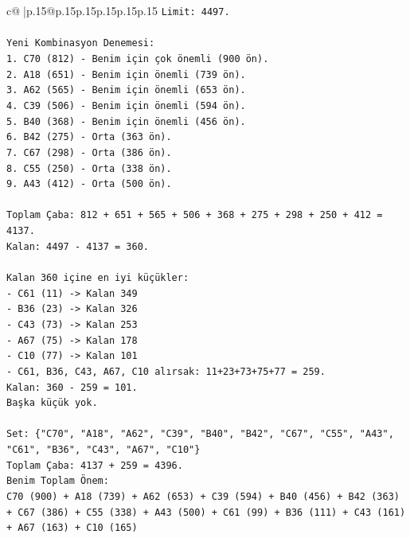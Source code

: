 \documentclass{article}
\begin{document}
{\begin{supertabular}{c@{$\;$}|p{.15\linewidth}@{}p{.15\linewidth}p{.15\linewidth}p{.15\linewidth}p{.15\linewidth}p{.15\linewidth}}
{{{\texttt{Limit: 4497.} \\
\\ 
\texttt{Yeni Kombinasyon Denemesi:} \\
\texttt{1. C70 (812) {-} Benim için çok önemli (900 ön).} \\
\texttt{2. A18 (651) {-} Benim için önemli (739 ön).} \\
\texttt{3. A62 (565) {-} Benim için önemli (653 ön).} \\
\texttt{4. C39 (506) {-} Benim için önemli (594 ön).} \\
\texttt{5. B40 (368) {-} Benim için önemli (456 ön).} \\
\texttt{6. B42 (275) {-} Orta (363 ön).} \\
\texttt{7. C67 (298) {-} Orta (386 ön).} \\
\texttt{8. C55 (250) {-} Orta (338 ön).} \\
\texttt{9. A43 (412) {-} Orta (500 ön).} \\
\\ 
\texttt{Toplam Çaba: 812 + 651 + 565 + 506 + 368 + 275 + 298 + 250 + 412 = 4137.} \\
\texttt{Kalan: 4497 {-} 4137 = 360.} \\
\\ 
\texttt{Kalan 360 içine en iyi küçükler:} \\
\texttt{{-} C61 (11) {-}> Kalan 349} \\
\texttt{{-} B36 (23) {-}> Kalan 326} \\
\texttt{{-} C43 (73) {-}> Kalan 253} \\
\texttt{{-} A67 (75) {-}> Kalan 178} \\
\texttt{{-} C10 (77) {-}> Kalan 101} \\
\texttt{{-} C61, B36, C43, A67, C10 alırsak: 11+23+73+75+77 = 259.} \\
\texttt{Kalan: 360 {-} 259 = 101.} \\
\texttt{Başka küçük yok.} \\
\\ 
\texttt{Set: \{"C70", "A18", "A62", "C39", "B40", "B42", "C67", "C55", "A43", "C61", "B36", "C43", "A67", "C10"\}} \\
\texttt{Toplam Çaba: 4137 + 259 = 4396.} \\
\texttt{Benim Toplam Önem:} \\
\texttt{C70 (900) + A18 (739) + A62 (653) + C39 (594) + B40 (456) + B42 (363) + C67 (386) + C55 (338) + A43 (500) + C61 (99) + B36 (111) + C43 (161) + A67 (163) + C10 (165)} \\
}}}
\end{supertabular}}
\end{document}
